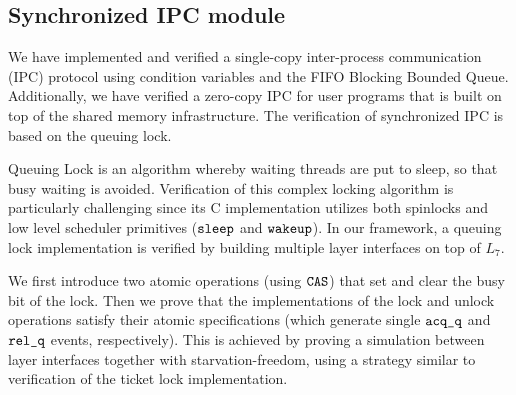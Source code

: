 {%

\subsection{Synchronized IPC module}
\label{sec:con:ipc}
We have implemented and verified a single-copy
inter-process communication (IPC) protocol using condition variables
and the FIFO Blocking Bounded Queue.
Additionally, we have verified a
zero-copy IPC for user programs that is built on top of the
shared memory infrastructure.
The verification of synchronized IPC is based on the 
queuing lock.

Queuing Lock is an algorithm whereby waiting threads are put to sleep,
so that busy waiting is avoided.
Verification of this complex locking algorithm is particularly
challenging since its C implementation utilizes both
spinlocks and low level scheduler primitives (${\texttt{sleep}}$ and ${\texttt{wakeup}}$).
In our framework, a queuing lock implementation is verified
by building multiple layer interfaces on top of $L_7$.


We first introduce two atomic operations (using ${\texttt{CAS}}$)
that set and clear the busy bit of the lock.
Then we prove that the implementations
of the lock and unlock operations
satisfy their atomic specifications
(which generate single ${\texttt{acq\_q}}$ and ${\texttt{rel\_q}}$ events, respectively).
This is achieved by proving a simulation between layer interfaces together
with starvation-freedom, using a strategy similar to verification of
the ticket lock implementation.

\ignore{
\begin{figure}
 = C, multicols=2] {source_code/ipc.c}
\caption{Implementation of Single-Copy IPC}
\label{fig:exp:ipc}
\end{figure}

\vspace{-3pt}
\paragraph{Trap handler}
\label{sec:base:trapm}

}}
